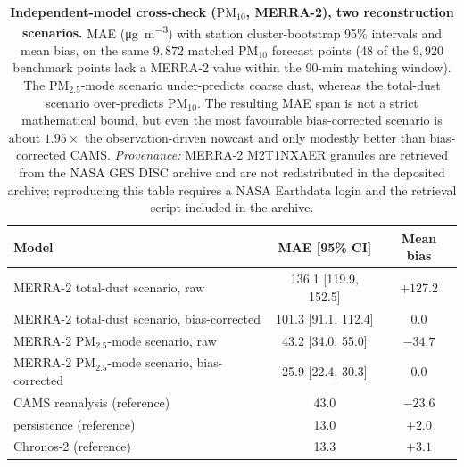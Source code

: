 \documentclass[11pt]{article}
\newcommand*{\pmten}{\ensuremath{\mathrm{PM_{10}}}}
\begin{document}
\begin{table}[htbp]\centering\footnotesize
\caption{\textbf{Independent-model cross-check (\pmten{}, MERRA-2), two reconstruction scenarios.} MAE (\si{\micro\gram\per\cubic\metre}) with station cluster-bootstrap 95\% intervals and mean bias, on the same $9{,}872$ matched \pmten{} forecast points (48 of the $9{,}920$ benchmark points lack a MERRA-2 value within the 90-min matching window). The PM$_{2.5}$-mode scenario under-predicts coarse dust, whereas the total-dust scenario over-predicts \pmten{}. The resulting MAE span is not a strict mathematical bound, but even the most favourable bias-corrected scenario is about $1.95\times$ the observation-driven nowcast and only modestly better than bias-corrected CAMS. \emph{Provenance:} MERRA-2 M2T1NXAER granules are retrieved from the NASA GES DISC archive and are not redistributed in the deposited archive; reproducing this table requires a NASA Earthdata login and the retrieval script included in the archive.}
\begin{tabular}{lcc}\toprule
Model & MAE [95\% CI] & Mean bias \\ \midrule
MERRA-2 total-dust scenario, raw & 136.1 [119.9, 152.5] & $+127.2$ \\
MERRA-2 total-dust scenario, bias-corrected & 101.3 [91.1, 112.4] & $0.0$ \\
MERRA-2 PM$_{2.5}$-mode scenario, raw & 43.2 [34.0, 55.0] & $-34.7$ \\
MERRA-2 PM$_{2.5}$-mode scenario, bias-corrected & 25.9 [22.4, 30.3] & $0.0$ \\
CAMS reanalysis (reference) & 43.0 & $-23.6$ \\
persistence (reference) & 13.0 & $+2.0$ \\
Chronos-2 (reference) & 13.3 & $+3.1$ \\
\bottomrule\end{tabular}\end{table}
\end{document}
